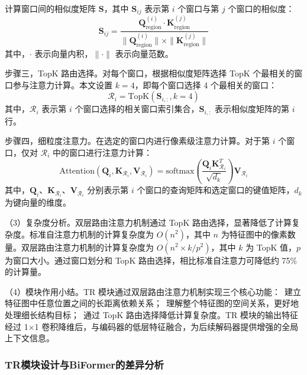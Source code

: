 计算窗口间的相似度矩阵 $\mathbf{S}$，其中 $\mathbf{S}_{ij}$ 表示第 $i$ 个窗口与第 $j$ 个窗口的相似度：
\begin{equation}
\mathbf{S}_{ij} = \frac{\mathbf{Q}_{\text{region}}^{(i)} \cdot \mathbf{K}_{\text{region}}^{(j)}}{\|\mathbf{Q}_{\text{region}}^{(i)}\| \times \|\mathbf{K}_{\text{region}}^{(j)}\|}
\label{eq:routing_similarity}
\end{equation}
其中，$\cdot$ 表示向量内积，$\|\cdot\|$ 表示向量范数。

步骤三，TopK 路由选择。对每个窗口，根据相似度矩阵选择 TopK 个最相关的窗口参与注意力计算。本文设置 $k=4$，即每个窗口选择 4 个最相关的窗口：
\begin{equation}
\mathcal{R}_i = \text{TopK}(\mathbf{S}_{i,:}, k=4)
\label{eq:topk_routing}
\end{equation}
其中，$\mathcal{R}_i$ 表示第 $i$ 个窗口选择的相关窗口索引集合，$\mathbf{S}_{i,:}$ 表示相似度矩阵的第 $i$ 行。

步骤四，细粒度注意力。在选定的窗口内进行像素级注意力计算。对于第 $i$ 个窗口，仅对 $\mathcal{R}_i$ 中的窗口进行注意力计算：
\begin{equation}
\text{Attention}(\mathbf{Q}_i, \mathbf{K}_{\mathcal{R}_i}, \mathbf{V}_{\mathcal{R}_i}) = \text{softmax}\left(\frac{\mathbf{Q}_i \mathbf{K}_{\mathcal{R}_i}^T}{\sqrt{d_k}}\right) \mathbf{V}_{\mathcal{R}_i}
\label{eq:fine_attention}
\end{equation}
其中，$\mathbf{Q}_i$、$\mathbf{K}_{\mathcal{R}_i}$、$\mathbf{V}_{\mathcal{R}_i}$ 分别表示第 $i$ 个窗口的查询矩阵和选定窗口的键值矩阵，$d_k$ 为键向量的维度。

（3）复杂度分析。双层路由注意力机制通过 TopK 路由选择，显著降低了计算复杂度。标准自注意力机制的计算复杂度为 $O(n^2)$，其中 $n$ 为特征图中的像素数量。双层路由注意力机制的计算复杂度为 $O(n^2 \times k/p^2)$，其中 $k$ 为 TopK 值，$p$ 为窗口大小。通过窗口划分和 TopK 路由选择，相比标准自注意力可降低约 75\% 的计算量。

（4）模块作用小结。TR 模块通过双层路由注意力机制实现三个核心功能：~建立特征图中任意位置之间的长距离依赖关系；~理解整个特征图的空间关系，更好地处理细长结构目标；~通过 TopK 路由选择降低计算复杂度。TR 模块的输出特征经过 1×1 卷积降维后，与编码器的低层特征融合，为后续解码器提供增强的全局上下文信息。

\subsubsection{TR模块设计与BiFormer的差异分析}


